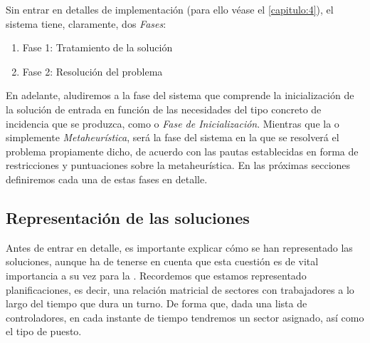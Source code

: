 
Sin entrar en detalles de implementación (para ello véase el \autoref{capitulo:4}), el sistema tiene, claramente, dos 
\textit{Fases}:
\begin{enumerate}[label={}]
	\item \label{Fase 1} Fase 1: Tratamiento de la solución
	\item \label{Fase 2} Fase 2: Resolución del problema
\end{enumerate}

En adelante, aludiremos a la fase del sistema que comprende la inicialización de la solución de entrada en función de las necesidades del tipo concreto de incidencia que se produzca, como \faseuno{} o \textit{Fase de Inicialización}. 
Mientras que la \fasedos{} o simplemente \textit{Metaheurística}, será la fase del sistema en la que se resolverá el problema propiamente dicho, de acuerdo con las pautas establecidas en forma de restricciones y puntuaciones sobre la metaheurística.
En las próximas secciones definiremos cada una de estas fases en detalle.

\subsection{Representación de las soluciones}
\label{sec:3:representacion-soluciones}

Antes de entrar en detalle, es importante explicar cómo se han representado las soluciones, aunque ha de tenerse en cuenta que esta cuestión es de vital importancia a su vez para la \fasedos{}. Recordemos que estamos representado planificaciones, es decir, una relación matricial de sectores con trabajadores a lo largo del tiempo que dura un turno. De forma que, dada una lista de controladores, en cada instante de tiempo tendremos un sector asignado, así como el tipo de puesto. %


